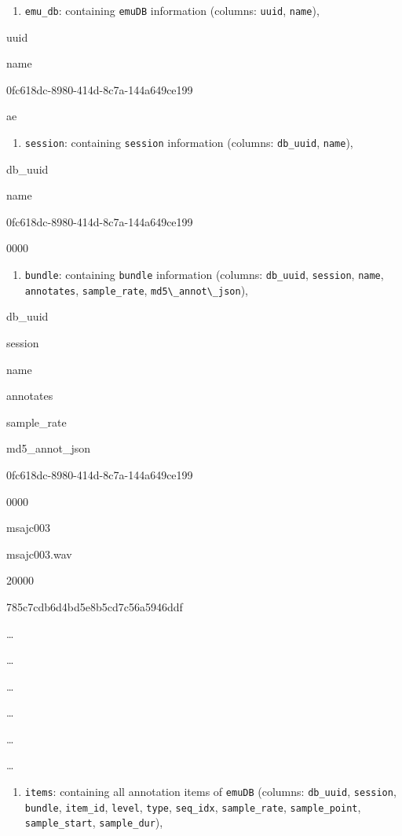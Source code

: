 \documentclass[]{book}
\providecommand{\tightlist}{%
  \setlength{\itemsep}{0pt}\setlength{\parskip}{0pt}}
\begin{document}
\begin{enumerate}
\def\labelenumi{\arabic{enumi}.}
\tightlist
\item
  \texttt{emu\_db}: containing \texttt{emuDB} information (columns: \texttt{uuid}, \texttt{name}),
\end{enumerate}

uuid

name

0fc618dc-8980-414d-8c7a-144a649ce199

ae

\begin{enumerate}
\def\labelenumi{\arabic{enumi}.}
\setcounter{enumi}{1}
\tightlist
\item
  \texttt{session}: containing \texttt{session} information (columns: \texttt{db\_uuid}, \texttt{name}),
\end{enumerate}

db\_uuid

name

0fc618dc-8980-414d-8c7a-144a649ce199

0000

\begin{enumerate}
\def\labelenumi{\arabic{enumi}.}
\setcounter{enumi}{2}
\tightlist
\item
  \texttt{bundle}: containing \texttt{bundle} information (columns: \texttt{db\_uuid}, \texttt{session}, \texttt{name}, \texttt{annotates}, \texttt{sample\_rate}, \texttt{md5\textbackslash{}\_annot\textbackslash{}\_json}),
\end{enumerate}

db\_uuid

session

name

annotates

sample\_rate

md5\_annot\_json

0fc618dc-8980-414d-8c7a-144a649ce199

0000

msajc003

msajc003.wav

20000

785c7cdb6d4bd5e8b5cd7c56a5946ddf

\ldots{}

\ldots{}

\ldots{}

\ldots{}

\ldots{}

\ldots{}

\begin{enumerate}
\def\labelenumi{\arabic{enumi}.}
\setcounter{enumi}{3}
\tightlist
\item
  \texttt{items}: containing all annotation items of \texttt{emuDB} (columns: \texttt{db\_uuid}, \texttt{session}, \texttt{bundle}, \texttt{item\_id}, \texttt{level}, \texttt{type}, \texttt{seq\_idx}, \texttt{sample\_rate}, \texttt{sample\_point}, \texttt{sample\_start}, \texttt{sample\_dur}),
\end{enumerate}
\end{document}
